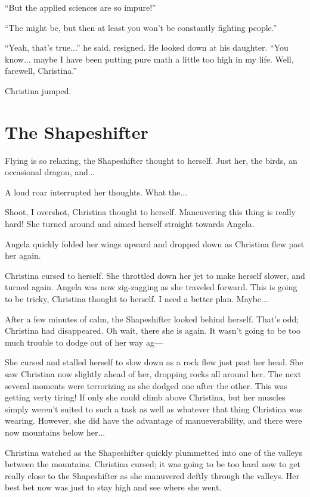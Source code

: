 \documentclass[showtrims,b6paper,draft,10pt]{memoir}
\begin{document}
``But the applied sciences are so impure!''

``The might be, but then at least you won't be constantly fighting people.''

``Yeah, that's true...'' he said, resigned.  He looked down at his daughter.  ``You know... maybe I have been putting pure math a little too high in my life.  Well, farewell, Christina.''

Christina jumped.

\timeskip
\chapter{The Shapeshifter}
Flying is so relaxing, the Shapeshifter thought to herself.  Just her, the birds, an occasional dragon, and...

A loud roar interrupted her thoughts.  What the... 

Shoot, I overshot, Christina thought to herself.  Maneuvering this thing is really hard!  She turned around and aimed herself straight towards Angela.

Angela quickly folded her wings upward and dropped down as Christina flew past her again.

Christina cursed to herself.  She throttled down her jet to make herself slower, and turned again.  Angela was now zig-zagging as she traveled forward.  This is going to be tricky, Christina thought to herself.  I need a better plan.  Maybe...

After a few minutes of calm, the Shapeshifter looked behind herself.  That's odd;  Christina had disappeared.  Oh wait, there she is again.  It wasn't going to be too much trouble to dodge out of her way ag---

She cursed and stalled herself to slow down as a rock flew just past her head.  She saw Christina now slightly ahead of her, dropping rocks all around her.  The next several moments were terrorizing as she dodged one after the other.  This was getting verty tiring!  If only she could climb above Christina, but her muscles simply weren't suited to such a task as well as whatever that thing Christina was wearing.  However, she did have the advantage of manueverability, and there were now mountains below her...

Christina watched as the Shapeshifter quickly plummetted into one of the valleys between the mountains.  Christina cursed;  it was going to be too hard now to get really close to the Shapeshifter as she manuvered deftly through the valleys.  Her best bet now was just to stay high and see where she went.
\end{document}
